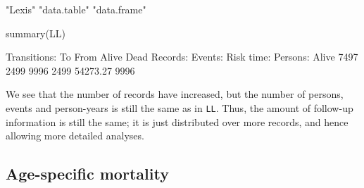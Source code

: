 \begin{enumerate}
\begin{Schunk}
\begin{Soutput}
[1] "Lexis"      "data.table" "data.frame"
\end{Soutput}
\begin{Sinput}
 summary(LL)
\end{Sinput}
\begin{Soutput}
Transitions:
     To
From    Alive Dead  Records:  Events: Risk time:  Persons:
  Alive  7497 2499      9996     2499   54273.27      9996
\end{Soutput}
\end{Schunk}
We see that the number of records have increased, but the number of
persons, events and person-years is still the same as in
\texttt{LL}. Thus, the amount of follow-up information is still the
same; it is just distributed over more records, and hence allowing
more detailed analyses.

\end{enumerate}

\subsection*{Age-specific mortality}

